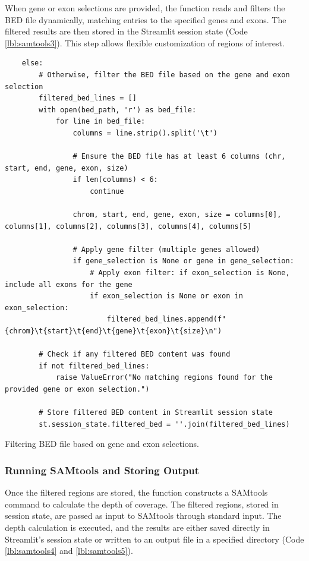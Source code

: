 When gene or exon selections are provided, the function reads and filters the BED file dynamically, matching entries to the specified genes and exons. The filtered results are then stored in the Streamlit session state (Code \ref{lbl:samtools3}). This step allows flexible customization of regions of interest.

\begin{longlisting}
\begin{verbatim}
    else:
        # Otherwise, filter the BED file based on the gene and exon selection
        filtered_bed_lines = []
        with open(bed_path, 'r') as bed_file:
            for line in bed_file:
                columns = line.strip().split('\t')

                # Ensure the BED file has at least 6 columns (chr, start, end, gene, exon, size)
                if len(columns) < 6:
                    continue

                chrom, start, end, gene, exon, size = columns[0], columns[1], columns[2], columns[3], columns[4], columns[5]

                # Apply gene filter (multiple genes allowed)
                if gene_selection is None or gene in gene_selection:
                    # Apply exon filter: if exon_selection is None, include all exons for the gene
                    if exon_selection is None or exon in exon_selection:
                        filtered_bed_lines.append(f"{chrom}\t{start}\t{end}\t{gene}\t{exon}\t{size}\n")

        # Check if any filtered BED content was found
        if not filtered_bed_lines:
            raise ValueError("No matching regions found for the provided gene or exon selection.")

        # Store filtered BED content in Streamlit session state
        st.session_state.filtered_bed = ''.join(filtered_bed_lines)
\end{verbatim}
\caption{Filtering BED file based on gene and exon selections.}
\label{lbl:samtools3}
\end{longlisting}

\subsubsection{\textbf{Running SAMtools and Storing Output}}

Once the filtered regions are stored, the function constructs a SAMtools command to calculate the depth of coverage. The filtered regions, stored in session state, are passed as input to SAMtools through standard input. The depth calculation is executed, and the results are either saved directly in Streamlit's session state or written to an output file in a specified directory (Code \ref{lbl:samtools4} and \ref{lbl:samtools5}).

